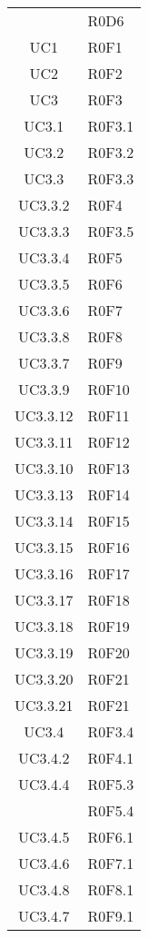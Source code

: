 \begin{center}
\begin{longtable}{ c m{4cm} }
	\rowcolor{white}& R0D6\\
	\rowcolor{tableRow}UC1 & R0F1\\
	\rowcolor{white}UC2 & R0F2\\
	\rowcolor{tableRow}UC3 & R0F3\\
	\rowcolor{white}UC3.1 & R0F3.1\\
	\rowcolor{tableRow}UC3.2 & R0F3.2\\
	\rowcolor{white}UC3.3 & R0F3.3\\
	\rowcolor{tableRow}UC3.3.2 & R0F4\\
	\rowcolor{white}UC3.3.3 & R0F3.5\\
	\rowcolor{tableRow}UC3.3.4 & R0F5\\
	\rowcolor{white}UC3.3.5 & R0F6\\
	\rowcolor{tableRow}UC3.3.6 & R0F7\\
	\rowcolor{white}UC3.3.8 & R0F8\\
	\rowcolor{tableRow}UC3.3.7 & R0F9\\
	\rowcolor{white}UC3.3.9 & R0F10\\
	\rowcolor{tableRow}UC3.3.12 & R0F11\\
	\rowcolor{white}UC3.3.11 & R0F12\\
	\rowcolor{tableRow}UC3.3.10 & R0F13\\
	\rowcolor{white}UC3.3.13 & R0F14\\
	\rowcolor{tableRow}UC3.3.14 & R0F15\\
	\rowcolor{white}UC3.3.15 & R0F16\\
	\rowcolor{tableRow}UC3.3.16 & R0F17\\
	\rowcolor{white}UC3.3.17 & R0F18\\
	\rowcolor{tableRow}UC3.3.18 & R0F19\\
	\rowcolor{white}UC3.3.19 & R0F20\\
	\rowcolor{tableRow}UC3.3.20 & R0F21\\
	\rowcolor{white}UC3.3.21 & R0F21\\
	\rowcolor{tableRow}UC3.4 & R0F3.4\\
	\rowcolor{white}UC3.4.2 & R0F4.1\\
	\rowcolor{tableRow}UC3.4.4 & R0F5.3\\
	\rowcolor{tableRow}& R0F5.4\\
	\rowcolor{white}UC3.4.5 & R0F6.1\\
	\rowcolor{tableRow}UC3.4.6 & R0F7.1\\
	\rowcolor{white}UC3.4.8 & R0F8.1\\
	\rowcolor{tableRow}UC3.4.7 & R0F9.1\\

\end{longtable}
\end{center}
